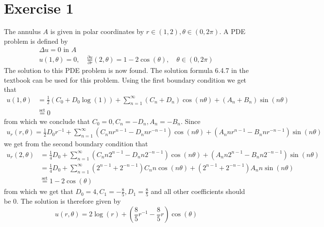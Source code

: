 \def\homeworknumber{3}
\def\homeworkdate{24-10-2011}




    \maketitle

    \section*{Exercise 1}
    The annulus $A$ is given in polar coordinates by $r\in(1,2), \theta\in(0,2\pi)$. A PDE problem is defined by
    \begin{gather}
        \Delta u = 0 \text{ in }A \\
        u(1,\theta) = 0,\quad \frac{\partial u}{\partial r}(2,\theta) = 1 - 2\cos(\theta),\quad \theta\in(0,2\pi)
    \end{gather}
    The solution to this PDE problem is now found. The solution formula 6.4.7 in the textbook can be used for this problem. Using the first boundary condition we get that
    \begin{align*}
        u(1,\theta) &= \frac{1}{2}(C_0 + D_0\log(1)) + \sum_{n=1}^\infty (C_n+D_n)\cos(n\theta) + (A_n+B_n)\sin(n\theta) \\
        &\overset{\text{set}}{=} 0
    \end{align*}
    from which we conclude that $C_0=0, C_n=-D_n, A_n=-B_n$. Since
    \begin{align*}
        u_r(r, \theta) = \frac{1}{2}D_0r^{-1} + \sum_{n=1}^\infty (C_n n r^{n-1} - D_n n r^{-n-1})\cos(n\theta) + (A_n n r^{n-1} - B_n n r^{-n-1})\sin(n\theta)
    \end{align*}
    we get from the second boundary condition that
    \begin{align*}
        u_r(2, \theta) &= \frac{1}{4}D_0 + \sum_{n=1}^\infty (C_n n 2^{n-1} - D_n n 2^{-n-1})\cos(n\theta) + (A_n n 2^{n-1} - B_n n 2^{-n-1})\sin(n\theta) \\
        &= \frac{1}{4}D_0 + \sum_{n=1}^\infty (2^{n-1} + 2^{-n-1})C_n n \cos(n\theta) + (2^{n-1} + 2^{-n-1})A_n n \sin(n\theta) \\
        &\overset{\text{set}}{=} 1 - 2\cos(\theta)
    \end{align*}
    from which we get that $D_0=4, C_1=-\frac{8}{5}, D_1=\frac{8}{5}$ and all other coefficients should be 0. The solution is therefore given by
    \begin{equation*}
        u(r, \theta) = 2\log{(r)} + (\frac{8}{5}r^{-1} - \frac{8}{5}r)\cos(\theta)
    \end{equation*}
